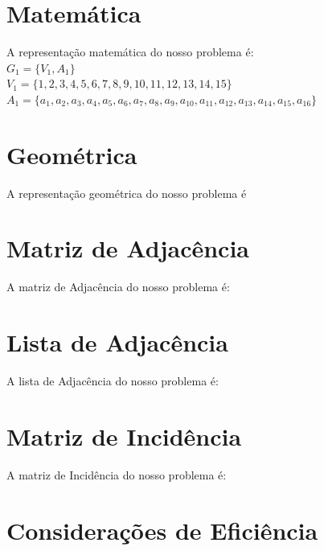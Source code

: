 \documentclass[
12pt,
a4paper,
semrecuonosumario,
sumario = abnt-6027-2012]{report}
\begin{document}
	\section{Matemática}\label{sec:matematica}

	A representação matemática do nosso problema é:\\
	$ G_1 = {\{V_1,A_1\}} $\\
	$V_1 = {\{1,2,3,4,5,6,7,8,9,10,11,12,13,14,15}\}$\\
	$A_1 = {\{a_1,a_2,a_3,a_4,a_5,a_6,a_7,a_8,a_9,a_{10}, a_{11},a_{12},a_{13},a_{14},a_{15},a_{16}\}}$\\


	\section{Geométrica}\label{sec:geometrica}

	A representação geométrica do nosso problema é



	\section{Matriz de Adjacência}\label{sec:matriz}

	A matriz de Adjacência do nosso problema é:

	\section{Lista de Adjacência}\label{sec:lista}

	A lista de Adjacência do nosso problema é:

	\section{Matriz de Incidência}\label{sec:incidencia}

	A matriz de Incidência do nosso problema é:

	\section{Considerações de Eficiência}\label{sec:eficienciaRepresentacao}
\end{document}
